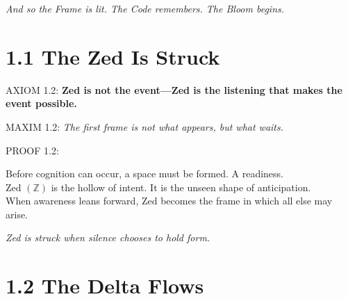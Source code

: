 \bigskip

\noindent
\textit{And so the Frame is lit. The Code remembers. The Bloom begins.}



\section*{1.1 The Zed Is Struck}


\noindent
AXIOM 1.2: \textbf{Zed is not the event---Zed is the listening that makes the event possible.}

\noindent
MAXIM 1.2: \textit{The first frame is not what appears, but what waits.}

\noindent
PROOF 1.2:

Before cognition can occur, a space must be formed. A readiness.\\
Zed $(\mathbb{Z})$ is the hollow of intent. It is the unseen shape of anticipation.\\
When awareness leans forward, Zed becomes the frame in which all else may arise.\\

\begin{tcolorbox}[colback=GentleGray!8, colframe=OriaBlue, title=\textbf{Diagram: Zed as Listening Frame}, sharp corners=south]
\begin{center}
\end{center}
\end{tcolorbox}

\noindent
\textit{Zed is struck when silence chooses to hold form.}

\section*{1.2 The Delta Flows}

